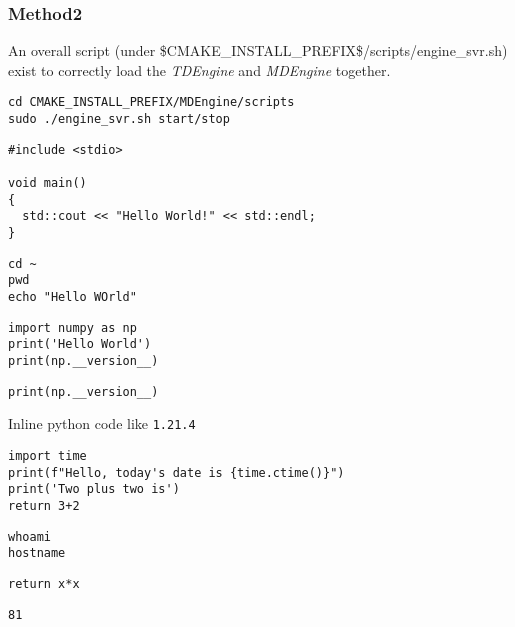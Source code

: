 \documentclass[11pt]{article}
\begin{document}
\subsubsection{Method2}
\label{sec:org132e6bf}
An overall script (under \$CMAKE\_INSTALL\_PREFIX\$/scripts/engine\_svr.sh) exist to correctly load the \emph{TDEngine} and \emph{MDEngine} together.
\begin{verbatim}
cd CMAKE_INSTALL_PREFIX/MDEngine/scripts
sudo ./engine_svr.sh start/stop
\end{verbatim}
\begin{verbatim}
#include <stdio>

void main()
{
  std::cout << "Hello World!" << std::endl;
}
\end{verbatim}

\begin{verbatim}
cd ~
pwd
echo "Hello WOrld"
\end{verbatim}

\begin{verbatim}
import numpy as np
print('Hello World')
print(np.__version__)
\end{verbatim}

\begin{verbatim}
print(np.__version__)
\end{verbatim}

Inline python code like \texttt{1.21.4}

\begin{verbatim}
import time 
print(f"Hello, today's date is {time.ctime()}")
print('Two plus two is')
return 3+2
\end{verbatim}

\begin{verbatim}
whoami
hostname
\end{verbatim}

\begin{verbatim}
return x*x
\end{verbatim}

\begin{verbatim}
81
\end{verbatim}
\end{document}

